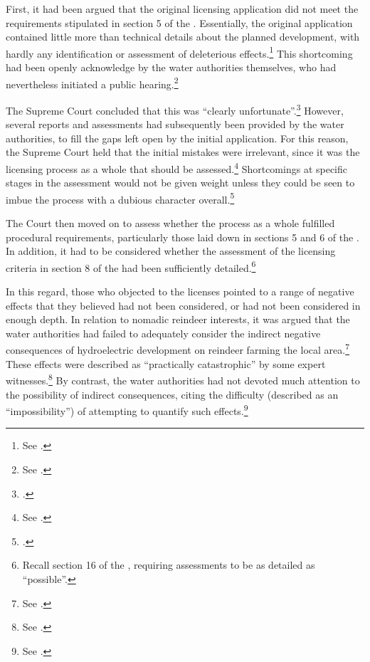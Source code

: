 First, it had been argued that the original licensing application did not meet the requirements stipulated in section 5 of the \cite{wra17}. Essentially, the original application contained little more than technical details about the planned development, with hardly any identification or assessment of deleterious effects.\footnote{See \cite[264-265]{alta82}.} This shortcoming had been openly acknowledge by the water authorities themselves, who had nevertheless initiated a public hearing.\footnote{See \cite[265]{alta82}.}

The Supreme Court concluded that this was ``clearly unfortunate''.\footcite[265]{alta82} However, several reports and assessments had subsequently been provided by the water authorities, to fill the gaps left open by the initial application. For this reason, the Supreme Court held that the initial mistakes were irrelevant, since it was the licensing process as a whole that should be assessed.\footnote{See \cite[265-266]{alta82}.} Shortcomings at specific stages in the assessment would not be given weight unless they could be seen to imbue the process with a dubious character overall.\footcite[265]{alta82}

The Court then moved on to assess whether the process as a whole fulfilled procedural requirements, particularly those laid down in sections 5 and 6 of the \cite{wra17}. In addition, it had to be considered whether the assessment of the licensing criteria in section 8 of the \cite{wra17} had been sufficiently detailed.\footnote{Recall section 16 of the \cite{paa67}, requiring assessments to be as detailed as ``possible''.}

In this regard, those who objected to the licenses pointed to a range of negative effects that they believed had not been considered, or had not been considered in enough depth. In relation to nomadic reindeer interests, it was argued that the water authorities had failed to adequately consider the indirect negative consequences of hydroelectric development on reindeer farming the local area.\footnote{See \cite[176-179]{alta82}.} These effects were described as ``practically catastrophic'' by some expert witnesses.\footnote{See \cite[278]{alta82}.} By contrast, the water authorities had not devoted much attention to the possibility of indirect consequences, citing the difficulty (described as an ``impossibility'') of attempting to quantify such effects.\footnote{See \cite[277]{alta82}.}

